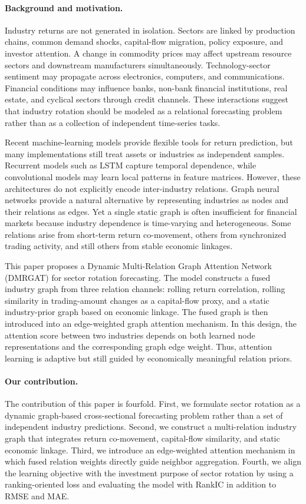 \documentclass[12pt]{article}
\begin{document}
\paragraph{Background and motivation.}
Industry returns are not generated in isolation. Sectors are linked by production chains, common demand shocks, capital-flow migration, policy exposure, and investor attention. A change in commodity prices may affect upstream resource sectors and downstream manufacturers simultaneously. Technology-sector sentiment may propagate across electronics, computers, and communications. Financial conditions may influence banks, non-bank financial institutions, real estate, and cyclical sectors through credit channels. These interactions suggest that industry rotation should be modeled as a relational forecasting problem rather than as a collection of independent time-series tasks.

Recent machine-learning models provide flexible tools for return prediction, but many implementations still treat assets or industries as independent samples. Recurrent models such as LSTM capture temporal dependence, while convolutional models may learn local patterns in feature matrices. However, these architectures do not explicitly encode inter-industry relations. Graph neural networks provide a natural alternative by representing industries as nodes and their relations as edges. Yet a single static graph is often insufficient for financial markets because industry dependence is time-varying and heterogeneous. Some relations arise from short-term return co-movement, others from synchronized trading activity, and still others from stable economic linkages.

This paper proposes a Dynamic Multi-Relation Graph Attention Network (DMRGAT) for sector rotation forecasting. The model constructs a fused industry graph from three relation channels: rolling return correlation, rolling similarity in trading-amount changes as a capital-flow proxy, and a static industry-prior graph based on economic linkage. The fused graph is then introduced into an edge-weighted graph attention mechanism. In this design, the attention score between two industries depends on both learned node representations and the corresponding graph edge weight. Thus, attention learning is adaptive but still guided by economically meaningful relation priors.

\paragraph{Our contribution.}
The contribution of this paper is fourfold. First, we formulate sector rotation as a dynamic graph-based cross-sectional forecasting problem rather than a set of independent industry predictions. Second, we construct a multi-relation industry graph that integrates return co-movement, capital-flow similarity, and static economic linkage. Third, we introduce an edge-weighted attention mechanism in which fused relation weights directly guide neighbor aggregation. Fourth, we align the learning objective with the investment purpose of sector rotation by using a ranking-oriented loss and evaluating the model with RankIC in addition to RMSE and MAE.
\end{document}
